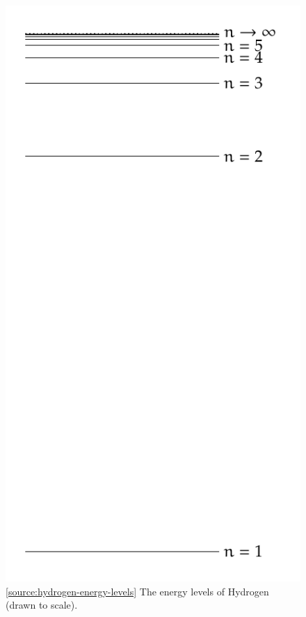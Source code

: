 \documentclass[oneside]{book}
\begin{document}
\begin{figure}[H]
    \centering
    \includegraphics[height=0.395\textheight,angle=90]{../images/Energy-Level/Energy-Level.pdf}
    \caption{\ref{source:hydrogen-energy-levels} The energy levels of Hydrogen (drawn to scale).}
    \label{fig:hydrogen-energy-levels}
\end{figure}
\newpage
\null
\vfill
\end{document}
